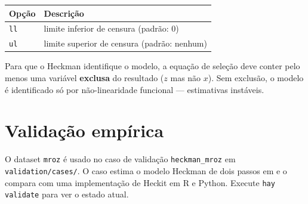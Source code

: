 \begin{center}
\begin{tabular}{ll}
\toprule
\textbf{Opção} & \textbf{Descrição} \\
\midrule
\texttt{ll} & limite inferior de censura (padrão: 0) \\
\texttt{ul} & limite superior de censura (padrão: nenhum) \\
\bottomrule
\end{tabular}
\end{center}

\begin{aviso}
  Para que o Heckman identifique o modelo, a equação de seleção deve conter
  pelo menos uma variável \textbf{exclusa} do resultado ($z$ mas não $x$).
  Sem exclusão, o modelo é identificado só por não-linearidade funcional —
  estimativas instáveis.
\end{aviso}

\section{Validação empírica}

O dataset \texttt{mroz} é usado no caso de validação
\texttt{heckman\_mroz} em \texttt{validation/cases/}. O caso estima o modelo
Heckman de dois passos em \hayashi{} e o compara com uma implementação de
Heckit em R e Python. Execute \lstinline{hay validate} para ver o estado
atual.
